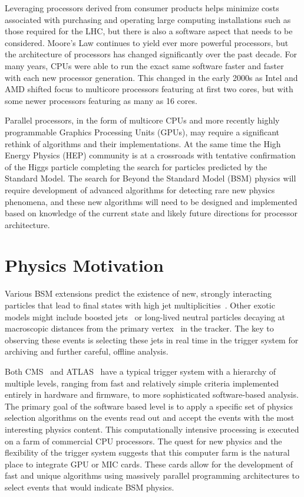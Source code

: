 \documentclass[preprint,sort&compress]{elsarticle}
\begin{document}
Leveraging processors derived from consumer products helps minimize costs associated with purchasing and operating large computing installations such as those required for the LHC, but there is also a software aspect that needs to be considered.  Moore's Law continues to yield ever more powerful processors, but the architecture of processors has changed significantly over the past decade.  For many years, CPUs were able to run the exact same software faster and faster with each new processor generation.  This changed in the early 2000s as Intel and AMD shifted focus to multicore processors featuring at first two cores, but with some newer processors featuring as many as 16 cores.

Parallel processors, in the form of multicore CPUs and more recently highly programmable Graphics Processing Units (GPUs), may require a significant rethink of algorithms and their implementations.  At the same time the High Energy Physics (HEP) community is at a crossroads with tentative confirmation of the Higgs particle completing the search for particles predicted by the Standard Model.  The search for Beyond the Standard Model (BSM) physics will require development of advanced algorithms for detecting rare new physics phenomena, and these new algorithms will need to be designed and implemented based on knowledge of the current state and likely future directions for processor architecture.

\section{Physics Motivation}

Various BSM extensions predict the existence of new, strongly interacting particles that lead to final states
with high jet multiplicities~\cite{bib:sixjets,bib:multijets,bib:tcgut,bib:exoquarks,bib:unichiral,bib:altchiral}. Other exotic models might include boosted 
jets~\cite{Thaler:2008ju,Altheimer:2012mn} or long-lived neutral particles decaying at macroscopic distances 
from the primary vertex~\cite{bib:hiddenvalley,Halyo:2013yfa} 
in the tracker. The key to observing these events is selecting these jets in real time in the trigger system for archiving
 and further careful, offline analysis.

Both CMS~\cite{Chatrchyan:2008aa} and ATLAS~\cite{Aad:2008zzm} have a typical trigger system with a hierarchy of multiple levels, 
ranging from fast and relatively simple criteria implemented entirely in hardware and firmware, to more sophisticated software-based analysis. 
The primary goal of the software based level is to apply a specific set of 
physics selection algorithms on the events read out and accept the events with the most interesting physics 
content. This computationally intensive processing is executed on a farm of commercial CPU processors.
The quest for new physics and the flexibility of the trigger system suggests that this computer farm is the natural
place to integrate GPU or MIC cards. These cards allow for the development of fast and unique algorithms using massively
 parallel programming architectures to select events that would indicate BSM physics. 
\end{document}
